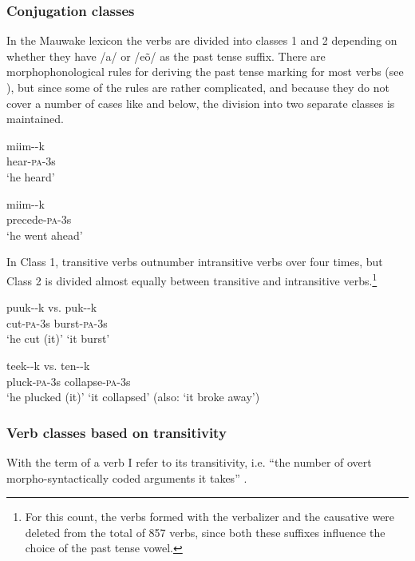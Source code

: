 \subsubsection{Conjugation classes}\label{sec:3.8.4.1}
{}
In the Mauwake lexicon the verbs are divided into classes 1 and 2 depending on whether they have /a/ or /e\~{o}/ as the past tense suffix. There are morphophonological rules for deriving the past tense marking for most verbs (see ), but since some of the rules are rather complicated, and because they do not cover a number of cases like  and  below, the division into two separate classes is maintained.

\ea%
\label{ex:3:x253}
\gll miim--k \\
hear-\textsc{pa}-3s \\
\glt`he heard'
\z

\ea%
\label{ex:3:x254}
\gll miim--k \\
precede-\textsc{pa}-3s \\
\glt`he went ahead'
\z

In Class 1, transitive verbs outnumber intransitive verbs over four times, but Class 2 is divided almost equally between transitive and intransitive verbs.\footnote{For this count, the verbs formed with the verbalizer  and the causative  were deleted from the total of 857 verbs, since both these suffixes influence the choice of the past tense vowel.}

\ea%
\label{ex:3:x255}
\gll puuk--k vs. puk--k \\
cut-\textsc{pa}-3s burst-\textsc{pa}-3s \\
\glt`he cut (it)' `it burst' 
\z

\ea%
\label{ex:3:x256}
\gll teek--k vs. ten--k \\
pluck-\textsc{pa}-3s collapse-\textsc{pa}-3s\\
\glt`he plucked (it)' `it collapsed' (also: `it broke away')
\z

\subsubsection{Verb classes based on transitivity}\label{sec:3.8.4.2}
{}
With the term  of a verb I refer to its  transitivity, i.e. ``{the number of overt morpho-syntactically coded arguments it takes}'' \citep[147]{VanValinEtAl1997}. 

